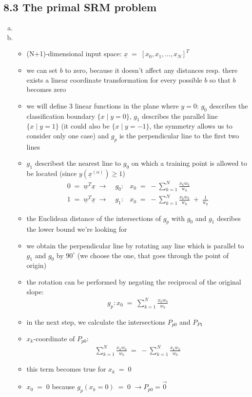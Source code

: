 \documentclass[10pt,a4paper]{article}
\begin{document}
\subsection*{8.3 The primal SRM problem}
\begin{enumerate}[a)]
\item

\item
\begin{itemize}
\item (N+1)-dimensional input space: $\underline{x}\;=\;[x_0,x_1,...,x_N]^T$
\item we can set $b$ to zero, because it doesn't affect any distances resp. there exists a linear coordinate transformation for every possible $b$ so that $b$ becomes zero
\item we will define 3 linear functions in the plane where $y=0$: $g_0$ describes the classification boundary $\{x\;|\;y=0\}$, $g_1$ describes the parallel line $\{x\;|\; y=1\}$ (it could also be $\{x\;| \; y=-1\}$, the symmetry allows us to consider only one case) and
$g_p$ is the perpendicular line to the first two lines
\item $g_1$ describest the nearest line to $g_0$ on which a training point is allowed to be located (since $y(\underline{x}^{(\alpha)})\geq1$)
\begin{eqnarray}
0\;=\;\underline{w}^T \underline{x}\;\rightarrow\; &g_0:& x_0\;=\;-\sum_{k=1}^N \frac{x_k w_k}{w_0}\\
1\;=\;\underline{w}^T \underline{x}\;\rightarrow\; &g_1:& x_0\;=\;-\sum_{k=1}^N \frac{x_k w_k}{w_0}\;+\;\frac{1}{w_0}
\end{eqnarray}
\item the Euclidean distance of the intersections of $g_p$ with $g_0$ and $g_1$ desribes the lower bound we're looking for
\item we obtain the perpendicular line by rotating any line which is parallel to $g_1$ and $g_0$ by $90^{\circ}$ (we choose the one, that goes through the point of origin)
\item the rotation can be performed by negating the reciprocal of the original slope:
\begin{eqnarray}
g_p: x_0\;=\; \sum_{k=1}^N \frac{x_k w_0}{w_k}
\end{eqnarray}

\item in the next step, we calculate the intersections $P_{p0}$ and $P_{P1}$
\item $x_k$-coordinate of $P_{p0}$:
\begin{eqnarray}
\sum_{k=1}^N \frac{x_k w_0}{w_k} \;=\; -\sum_{k=1}^N \frac{x_k w_k}{w_0}
\end{eqnarray}
\item this term becomes true for $x_k\;=\; 0$
\item $x_0\;=\;0$ because $g_p(x_k=0)\;=\;0$ $\rightarrow P_{p0} = \vec{0}$


\end{itemize}
\end{enumerate}
\end{document}
